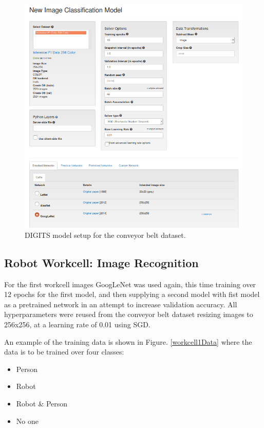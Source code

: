 \documentclass[10pt,journal,compsoc]{IEEEtran}
\begin{document}
\begin{figure}[thpb]
  \centering
  \includegraphics[width=\linewidth]{../img/P1-Dataset/P1-Model-Setup.png}
  \caption{DIGITS model setup for the conveyor belt dataset.}
  \label{p1ModelSetup}
\end{figure}


\subsection{Robot Workcell: Image Recognition}
\label{subsec:WC1Formulation}

For the first workcell images GoogLeNet was used again, this time training over 12 epochs for the first model, and then supplying a second model with fist model as a pretrained network in an attempt to increase validation accuracy. All hyperparameters were reused from the conveyor belt dataset resizing images to 256x256, at a learning rate of 0.01 using SGD.

An example of the training data is shown in Figure. \ref{workcell1Data} where the data is to be trained over four classes:

\begin{itemize}
  \item Person
  \item Robot
  \item Robot \& Person
  \item No one
\end{itemize}
\end{document}
